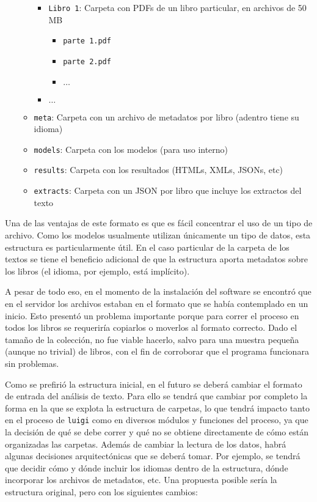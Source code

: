 \documentclass[11pt]{article}
\begin{document}
\begin{itemize}
\begin{itemize}
		\begin{itemize}
			\item \texttt{Libro 1}: Carpeta con PDFs de un libro particular, en archivos de 50 MB
			\begin{itemize}
				\item \texttt{parte 1.pdf}
				\item \texttt{parte 2.pdf}
				\item $\dots$
			\end{itemize}
			\item $\dots$
		\end{itemize}
		\item \texttt{meta}: Carpeta con un archivo de metadatos por libro (adentro tiene su idioma)
		\item \texttt{models}: Carpeta con los modelos (para uso interno)
		\item \texttt{results}: Carpeta con los resultados (HTMLs, XMLs, JSONs, etc)
		\item \texttt{extracts}: Carpeta con un JSON por libro que incluye los extractos del texto
	\end{itemize}
\end{itemize}

Una de las ventajas de este formato es que es fácil concentrar el uso de un tipo de archivo. Como los modelos usualmente utilizan únicamente un tipo de datos, esta estructura es particularmente útil. En el caso particular de la carpeta de los textos se tiene el beneficio adicional de que la estructura aporta metadatos sobre los libros (el idioma, por ejemplo, está implícito).

A pesar de todo eso, en el momento de la instalación del software se encontró que en el servidor los archivos estaban en el formato que se había contemplado en un inicio. Esto presentó un problema importante porque para correr el proceso en todos los libros se requeriría copiarlos o moverlos al formato correcto. Dado el tamaño de la colección, no fue viable hacerlo, salvo para una muestra pequeña (aunque no trivial) de libros, con el fin de corroborar que el programa funcionara sin problemas.

Como se prefirió la estructura inicial, en el futuro se deberá cambiar el formato de entrada del análisis de texto. Para ello se tendrá que cambiar por completo la forma en la que se explota la estructura de carpetas, lo que tendrá impacto tanto en el proceso de \texttt{luigi} como en diversos módulos y funciones del proceso, ya que la decisión de qué se debe correr y qué no se obtiene directamente de cómo están organizadas las carpetas. Además de cambiar la lectura de los datos, habrá algunas decisiones arquitectónicas que se deberá tomar. Por ejemplo, se tendrá que decidir cómo y dónde incluir los idiomas dentro de la estructura, dónde incorporar los archivos de metadatos, etc. Una propuesta posible sería la estructura original, pero con los siguientes cambios:
\end{document}
